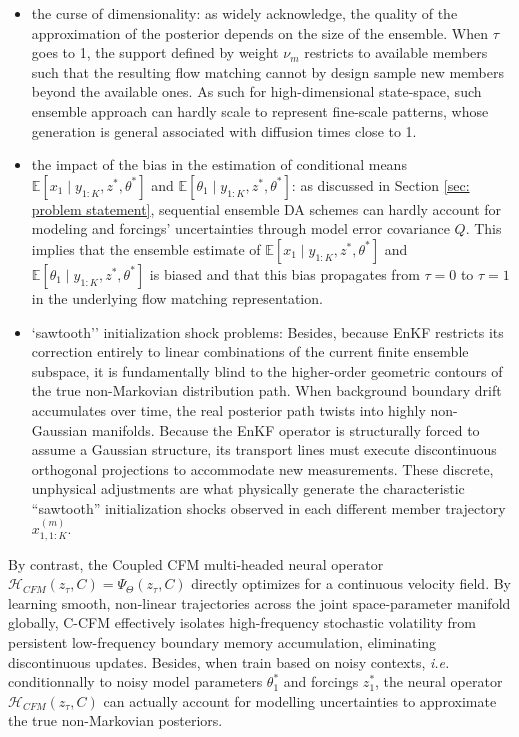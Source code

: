 \documentclass[10pt]{article}
\begin{document}
\begin{itemize}
    \item the curse of dimensionality: as widely acknowledge, the quality of the approximation of the posterior depends on the size of the ensemble. When $\tau$ goes to 1, the support defined by weight $\nu_{m}$ restricts to available members such that the resulting flow matching cannot by design sample new members beyond the available ones. As such for high-dimensional state-space, such ensemble approach can hardly scale to represent fine-scale patterns, whose generation is general associated with diffusion times close to 1.    
    \item the impact of the bias in the estimation of conditional means $\mathbb{E}[x_1 \mid  y_{1:K}, z^*, \theta^*]$ and $\mathbb{E}[\theta_1 \mid  y_{1:K}, z^*, \theta^*]$: as discussed in Section \ref{sec: problem statement}, sequential ensemble DA schemes \cite{carrassi_data_2018} can hardly account for modeling and forcings' uncertainties through model error covariance $Q$. This implies that the ensemble estimate of $\mathbb{E}[x_1 \mid  y_{1:K}, z^*, \theta^*]$ and $\mathbb{E}[\theta_1 \mid  y_{1:K}, z^*, \theta^*]$ is biased and that this bias propagates from $\tau=0$ to $\tau=1$ in the underlying flow matching representation.
    \item `sawtooth'' initialization shock problems: Besides, because EnKF restricts its correction entirely to linear combinations of the current finite ensemble subspace, it is fundamentally blind to the higher-order geometric contours of the true non-Markovian distribution path. When background boundary drift accumulates over time, the real posterior path twists into highly non-Gaussian manifolds. Because the EnKF operator is structurally forced to assume a Gaussian structure, its transport lines must execute discontinuous orthogonal projections to accommodate new measurements. These discrete, unphysical adjustments are what physically generate the characteristic ``sawtooth'' initialization shocks observed in each different member trajectory  $x_{1,1:K}^{(m)}$. 
\end{itemize}
By contrast, the Coupled CFM multi-headed neural operator $\mathcal{H}_{CFM}(z_{\tau}, C) = \Psi_{\Theta}(z_{\tau}, C)$ directly optimizes for a continuous velocity field. By learning smooth, non-linear trajectories across the joint space-parameter manifold globally, C-CFM effectively isolates high-frequency stochastic volatility from persistent low-frequency boundary memory accumulation, eliminating discontinuous updates. Besides, when train based on noisy contexts, {\em i.e.} conditionnally to noisy model parameters $\theta_1^*$ and forcings $z_1^*$, the neural operator $\mathcal{H}_{CFM}(z_{\tau}, C)$ can actually account for modelling uncertainties to approximate the true non-Markovian posteriors. 
\fi
\end{document}
